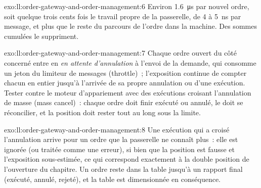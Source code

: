 \begin{solution}{exo:ll:order-gateway-and-order-management:6}
Environ \qty{1.6}{\micro\second} par nouvel ordre, soit quelque trois cents fois le travail propre de la passerelle, de 4 à \qty{5}{\nano\second} par
message, et plus que le reste du parcours de l'ordre dans la machine. Des sommes cumulées le suppriment.
\end{solution}

\begin{solution}{exo:ll:order-gateway-and-order-management:7}
Chaque ordre ouvert du côté concerné entre en \emph{en attente d'annulation} à l'envoi de la demande, qui consomme un jeton du limiteur de messages (throttle)~;
l'exposition continue de compter chacun en entier jusqu'à l'arrivée de sa propre annulation ou d'une exécution. Tester contre le moteur d'appariement avec des exécutions
croisant l'annulation de masse (mass cancel)~: chaque ordre doit finir exécuté ou annulé, le  doit se réconcilier, et la position doit rester
tout au long sous la limite.
\end{solution}

\begin{solution}{exo:ll:order-gateway-and-order-management:8}
Une exécution qui a croisé l'annulation arrive pour un ordre que la passerelle ne connaît plus~: elle est ignorée (ou traitée comme une erreur), si bien que
la position est fausse et l'exposition sous-estimée, ce qui correspond exactement à la double position de l'ouverture du chapitre. Un ordre
reste dans la table jusqu'à un rapport final (exécuté, annulé, rejeté), et la table est dimensionnée en conséquence.
\end{solution}

